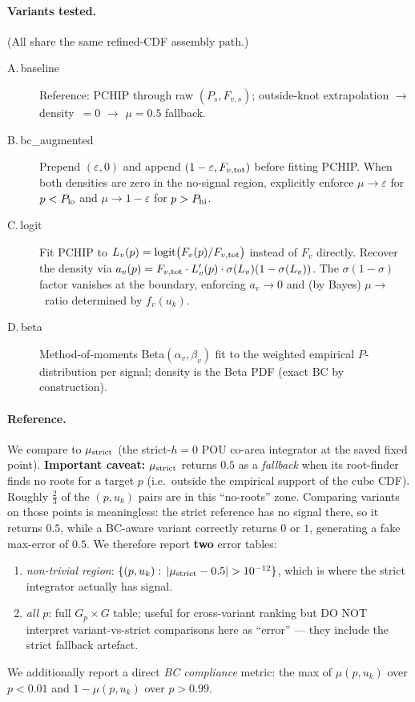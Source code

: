 \documentclass[11pt]{article}
\begin{document}
\paragraph{Variants tested.} (All share the same refined-CDF assembly path.)
\begin{description}
  \item[A.\,baseline] Reference: PCHIP through raw $(P_s, F_{v,s})$;
        outside-knot extrapolation $\to$ density~$=0$ $\to$ $\mu=0.5$ fallback.
  \item[B.\,bc\_augmented] Prepend $(\varepsilon, 0)$ and append
        $(1-\varepsilon, F_{v,\rm tot})$ before fitting PCHIP. When both
        densities are zero in the no-signal region, explicitly enforce
        $\mu\to\!\varepsilon$ for $p<P_{\rm lo}$ and $\mu\to 1\!-\!\varepsilon$
        for $p>P_{\rm hi}$.
  \item[C.\,logit] Fit PCHIP to $L_v(p) = \mathrm{logit}\bigl(F_v(p)/F_{v,\rm tot}\bigr)$
        instead of $F_v$ directly. Recover the density via
        $a_v(p) = F_{v,\rm tot}\cdot L_v'(p)\cdot\sigma(L_v)(1-\sigma(L_v))$.
        The $\sigma(1-\sigma)$ factor vanishes at the boundary, enforcing
        $a_v\to 0$ and (by Bayes) $\mu\to$~ratio determined by $f_v(u_k)$.
  \item[D.\,beta] Method-of-moments Beta$(\alpha_v,\beta_v)$ fit to the
        weighted empirical $P$-distribution per signal; density is the Beta
        PDF (exact BC by construction).
\end{description}

\paragraph{Reference.} We compare to $\mu_{\rm strict}$ (the strict-$h=0$ POU
co-area integrator at the saved fixed point). \textbf{Important caveat:}
$\mu_{\rm strict}$ returns $0.5$ as a \emph{fallback} when its root-finder
finds no roots for a target $p$ (i.e.\ outside the empirical support of the
cube CDF). Roughly $\frac{2}{3}$ of the $(p,u_k)$ pairs are in this
``no-roots'' zone. Comparing variants on those points is meaningless: the
strict reference has no signal there, so it returns $0.5$, while a BC-aware
variant correctly returns $0$ or $1$, generating a fake max-error of
$0.5$. We therefore report \textbf{two} error tables:
\begin{enumerate}
  \item \emph{non-trivial region}: $\{(p,u_k):\, |\mu_{\rm strict}-0.5|>10^{-12}\}$,
        which is where the strict integrator actually has signal.
  \item \emph{all $p$}: full $G_p\times G$ table; useful for cross-variant
        ranking but DO NOT interpret variant-vs-strict comparisons here as
        ``error'' --- they include the strict fallback artefact.
\end{enumerate}
We additionally report a direct \emph{BC compliance} metric: the max of
$\mu(p,u_k)$ over $p<0.01$ and $1-\mu(p,u_k)$ over $p>0.99$.
\end{document}
